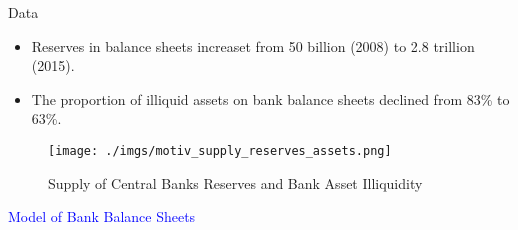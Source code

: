 \documentclass[notes,11pt, aspectratio=169]{beamer}
\begin{document}



\begin{frame}{Data}
\vspace{0.5cm}
  \begin{itemize}
    \item  Reserves in balance sheets increaset from 50 billion (2008) to 2.8 trillion (2015).
    \item The proportion of illiquid assets on bank balance sheets declined from 83\% to 63\%.
  \end{itemize}
  
    \begin{figure}[t*]
      \centering

      \texttt{[image: ./imgs/motiv\_supply\_reserves\_assets.png]}
    \caption{Supply of Central Banks Reserves and Bank Asset Illiquidity}
    \end{figure}
    
  \end{frame}


\begin{frame}
    \textcolor{blue}{\huge{\centerline{Model of Bank Balance Sheets}}}

\end{frame}
    
\end{document}
